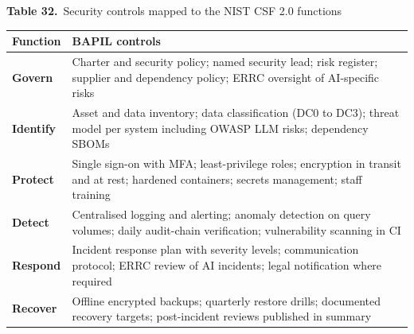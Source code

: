 \documentclass[border=10pt]{standalone}
\begin{document}
\begin{minipage}{17cm}
{\large\bfseries Table 32.}\ {\large Security controls mapped to the NIST CSF 2.0 functions}\par\vspace{7pt}
\small
{}
\begin{tabularx}{\linewidth}{@{}>{\hsize=0.377\hsize\raggedright\arraybackslash}X>{\hsize=1.623\hsize\raggedright\arraybackslash}X@{}}
\arrayrulecolor{bapilrule}\toprule
\rowcolor{white}\textbf{Function} & \textbf{BAPIL controls} \\
\midrule
\textbf{Govern} & Charter and security policy; named security lead; risk register; supplier and dependency policy; ERRC oversight of AI-specific risks \\
\textbf{Identify} & Asset and data inventory; data classification (DC0 to DC3); threat model per system including OWASP LLM risks; dependency SBOMs \\
\textbf{Protect} & Single sign-on with MFA; least-privilege roles; encryption in transit and at rest; hardened containers; secrets management; staff training \\
\textbf{Detect} & Centralised logging and alerting; anomaly detection on query volumes; daily audit-chain verification; vulnerability scanning in CI \\
\textbf{Respond} & Incident response plan with severity levels; communication protocol; ERRC review of AI incidents; legal notification where required \\
\textbf{Recover} & Offline encrypted backups; quarterly restore drills; documented recovery targets; post-incident reviews published in summary \\
\bottomrule
\end{tabularx}
\par{}
\end{minipage}
\end{document}
